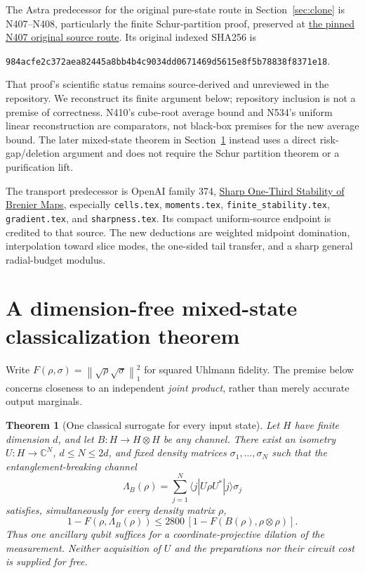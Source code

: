 \documentclass[11pt]{article}
\newtheorem{theorem}{Theorem}
\newcommand{\norm}[1]{\left\lVert#1\right\rVert}
\begin{document}
The Astra predecessor for the original pure-state route in Section~\ref{sec:clone} is N407--N408, particularly the finite Schur-partition proof, preserved at
\href{https://github.com/harjassand/astra-research-knowledge/blob/b2a7a8fa91a8fcf6da05f36100ae4ce64a72a729/web/pages/d-2115f1527533d2f7.html}{the pinned N407 original source route}.
Its original indexed SHA256 is
\begin{center}\small\texttt{984acfe2c372aea82445a8bb4b4c9034dd0671469d5615e8f5b78838f8371e18}.
\end{center}
That proof's scientific status remains source-derived and unreviewed in the repository. We reconstruct its finite argument below; repository inclusion is not a premise of correctness. N410's cube-root average bound and N534's uniform linear reconstruction are comparators, not black-box premises for the new average bound. The later mixed-state theorem in Section~\ref{sec:mixed} instead uses a direct risk-gap/deletion argument and does not require the Schur partition theorem or a purification lift.

The transport predecessor is OpenAI family 374,
\href{https://github.com/openai/math/tree/fd4aeeb2ee4fc729c18d98444fed42fd0529eeeb/preprints/Sharp-One-Third-Stability-of-Brenier-Maps-September-25-2026/build/source/sections}{Sharp One-Third Stability of Brenier Maps}, especially \texttt{cells.tex}, \texttt{moments.tex}, \texttt{finite\_stability.tex}, \texttt{gradient.tex}, and \texttt{sharpness.tex}. Its compact uniform-source endpoint is credited to that source. The new deductions are weighted midpoint domination, interpolation toward slice modes, the one-sided tail transfer, and a sharp general radial-budget modulus.

\section{A dimension-free mixed-state classicalization theorem}\label{sec:mixed}

Write $F(\rho,\sigma)=\norm{\sqrt\rho\sqrt\sigma}_1^2$ for squared Uhlmann fidelity. The premise below concerns closeness to an independent \emph{joint product}, rather than merely accurate output marginals.

\begin{theorem}[One classical surrogate for every input state]\label{thm:mixed}
Let $H$ have finite dimension $d$, and let $B:H\to H\otimes H$ be any channel. There exist an isometry $U:H\to\mathbb C^N$, $d\le N\le2d$, and fixed density matrices $\sigma_1,\ldots,\sigma_N$ such that the entanglement-breaking channel
\[
\Lambda_B(\rho)=\sum_{j=1}^N\langle j|U\rho U^*|j\rangle\sigma_j
\]
satisfies, simultaneously for every density matrix $\rho$,
\[
1-F(\rho,\Lambda_B(\rho))\le2800\,[1-F(B(\rho),\rho\otimes\rho)].
\tag{M1}
\]
Thus one ancillary qubit suffices for a coordinate-projective dilation of the \emph{measurement}. Neither acquisition of $U$ and the preparations nor their circuit cost is supplied for free.
\end{theorem}
\end{document}
